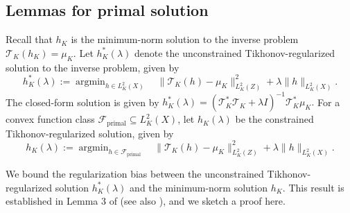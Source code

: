 \documentclass[11pt]{article}
\theoremstyle{plain}
\theoremstyle{definition}
\theoremstyle{remark}
\theoremstyle{definition}
\DeclareMathOperator*{\argmin}{argmin}
\begin{document}
\subsection{Lemmas for primal solution}
\label{appendix::primalreg}
Recall that \( h_K \) is the minimum-norm solution to the inverse problem \( \mathcal{T}_K(h_K) = \mu_K \). Let \( h_K^*(\lambda) \) denote the unconstrained Tikhonov-regularized solution to the inverse problem, given by  
\[
h_K^*(\lambda) := \argmin_{h \in L^2_K(X)} \quad \|\mathcal{T}_K(h) - \mu_K \|^2_{L^2_K(Z)} + \lambda \|h\|_{L^2_K(X)}.
\]
The closed-form solution is given by  
\(
h_K^*(\lambda) = \left( \mathcal{T}_K^* \mathcal{T}_K + \lambda I \right)^{-1} \mathcal{T}_K^* \mu_K.\)
For a convex function class \( \mathcal{F}_{\mathrm{primal}} \subseteq L^2_K(X) \), let \( h_K(\lambda) \) be the constrained Tikhonov-regularized solution, given by  
\[
h_K(\lambda) := \argmin_{h \in \mathcal{F}_{\mathrm{primal}}} \quad \|\mathcal{T}_K(h) - \mu_K \|^2_{L^2_K(Z)} + \lambda \|h\|_{L^2_K(X)}.
\]


We bound the regularization bias between the unconstrained Tikhonov-regularized solution \( h_K^*(\lambda) \) and the minimum-norm solution \( h_K \). This result is established in Lemma 3 of \cite{bennett2023source} (see also \cite{carrasco2007linear}), and we sketch a proof here.
\end{document}
